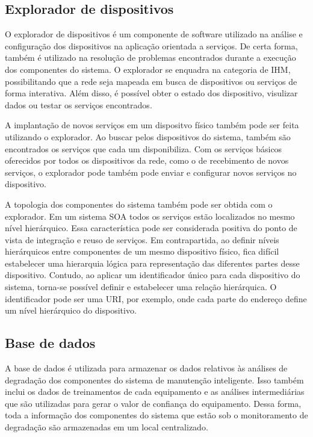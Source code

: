 \subsection{Explorador de dispositivos}

O explorador de dispositivos é um componente de software utilizado na análise e configuração dos
dispositivos na aplicação orientada a serviços. De certa forma, também é utilizado na resolução de
problemas encontrados durante a execução dos componentes do sistema. O explorador se enquadra na
categoria de \gls{IHM}, possibilitando que a rede seja mapeada em busca de dispositivos ou serviços
de forma interativa. Além disso, é possível obter o estado dos dispositivo, visulizar dados ou
testar os serviços encontrados.

A implantação de novos serviços em um dispositvo físico também pode ser feita utilizando o
explorador. Ao buscar pelos dispositivos do sistema, também são encontrados os serviços que cada um
disponibiliza. Com os serviços básicos oferecidos por todos os dispositivos da rede, como o de
recebimento de novos serviços, o explorador pode também pode enviar e configurar novos serviços no
dispositivo.

A topologia dos componentes do sistema também pode ser obtida com o explorador. Em um sistema
\gls{SOA} todos os serviços estão localizados no mesmo nível hierárquico. Essa característica pode
ser considerada positiva do ponto de vista de integração e reuso de serviços. Em contrapartida, ao
definir níveis hierárquicos entre componentes de um mesmo dispositivo físico, fica difícil
estabelecer uma hierarquia lógica para representação das diferentes partes desse dispositivo.
Contudo, ao aplicar um identificador único para cada dispositivo do sistema, torna-se possível
definir e estabelecer uma relação hierárquica. O identificador pode ser uma \gls{URI}, por exemplo,
onde cada parte do endereço define um nível hierárquico do dispositivo.


\subsection{Base de dados}

A base de dados é utilizada para armazenar os dados relativos às análises de degradação dos
componentes do sistema de manutenção inteligente. Isso também inclui os dados de treinamentos de
cada equipamento e as análises intermediárias que são utilizadas para gerar o valor de confiança do
equipamento. Dessa forma, toda a informação dos componentes do sistema que estão sob o monitoramento
de degradação são armazenadas em um local centralizado.

